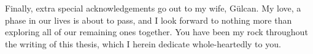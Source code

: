 \begin{acknowledge}[\normalfont\large\bfseries]
Finally, extra special acknowledgements go out to my wife, G\"ulcan.  My love, a phase in our lives is about to pass, and I look forward to nothing more than exploring all of our remaining ones together.  You have been my rock throughout the writing of this thesis, which I herein dedicate whole-heartedly to you.

\end{acknowledge}

